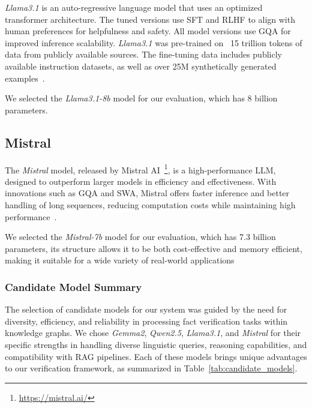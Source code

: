 \textit{Llama3.1} is an auto-regressive language model that uses an optimized transformer architecture.
The tuned versions use \ac{SFT} and \ac{RLHF} to align with human preferences for helpfulness and safety.
All model versions use \ac{GQA} for improved inference scalability.
\textit{Llama3.1} was pre-trained on ~15 trillion tokens of data from publicly available sources.
The fine-tuning data includes publicly available instruction datasets, as well as over 25M synthetically generated examples~\cite{dubey2024llama3herdmodels,meta2023llama3}.

We selected the \textit{Llama3.1-8b} model for our evaluation, which has 8 billion parameters.

\subsection{Mistral}\label{subsec:empirical-evaluation:candidate-models:mistral}
The \textit{Mistral} model, released by Mistral AI~\footnote{\url{https://mistral.ai/}}, is a high-performance LLM, designed to outperform larger models in efficiency and effectiveness.
With innovations such as \ac{GQA} and \ac{SWA}, Mistral offers faster inference and better handling of long sequences, reducing computation costs while maintaining high performance~\cite{jiang2023mistral7b,mistral7b_2023}.

We selected the \textit{Mistral-7b} model for our evaluation, which has 7.3 billion parameters, its structure allows it to be both cost-effective and memory efficient, making it suitable for a wide variety of real-world applications

\subsubsection{Candidate Model Summary}\label{subsubsec:empirical-evaluation:candidate-models:summary}
The selection of candidate models for our system was guided by the need for diversity, efficiency, and reliability in processing fact verification tasks within knowledge graphs.
We chose \textit{Gemma2}, \textit{Qwen2.5}, \textit{Llama3.1}, and \textit{Mistral} for their specific strengths in handling diverse linguistic queries, reasoning capabilities, and compatibility with RAG pipelines.
Each of these models brings unique advantages to our verification framework, as summarized in Table~\ref{tab:candidate_models}.

